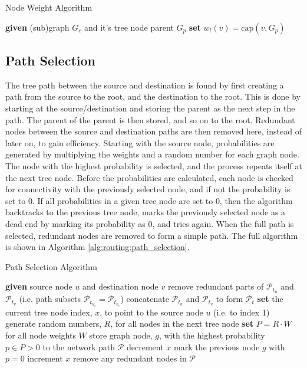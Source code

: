 \begin{algorithm}
	\caption{Node Weight Algorithm}
	\begin{algorithmic}[1]
		\STATE \textbf{given} (sub)graph $G_c$ and it's tree node parent $G_p$
			\STATE \textbf{set} $w_l(v)=\textrm{cap}(v,G_p) $
		\ENDFOR
	\end{algorithmic}
	\label{alg:routing:weight_algorithm}
\end{algorithm}

\subsection{Path Selection}\label{sec:routing:implementation:path_selection}

The tree path between the source and destination is found by first creating a path from the source to the root, and the destination to the root. This is done by starting at the source/destination and storing the parent as the next step in the path. The parent of the parent is then stored, and so on to the root. Redundant nodes between the source and destination paths are then removed here, instead of later on, to gain efficiency. Starting with the source node, probabilities are generated by multiplying the weights and a random number for each graph node. The node with the highest probability is selected, and the process repeats itself at the next tree node. Before the probabilities are calculated, each node is checked for connectivity with the previously selected node, and if not the probability is set to 0. If all probabilities in a given tree node are set to 0, then the algorithm backtracks to the previous tree node, marks the previously selected node as a dead end by marking its probability as 0, and tries again. When the full path is selected, redundant nodes are removed to form a simple path. The full algorithm is shown in Algorithm \ref{alg:routing:path_selection}.

\begin{algorithm}
	\caption{Path Selection Algorithm}
	\begin{algorithmic}[1]
		\STATE \textbf{given} source node $u$ and destination node $v$
		\STATE remove redundant parts of $\mathscr{P}_{t_u} $ and $\mathscr{P}_{t_v} $ (i.e. path subsets $\mathscr{P}_{t_{u_s}}=\mathscr{P}_{t_{v_s}} $)
		\STATE concatenate $\mathscr{P}_{t_u} $ and $\mathscr{P}_{t_v} $ to form $\mathscr{P}_t $
		\STATE \textbf{set} the current tree node index, $x$, to point to the source node $u$ (i.e. to index 1)
		\REPEAT
			\STATE generate random numbers, $R$, for all nodes in the next tree node
			\STATE \textbf{set} $P=R\cdot W $ for all node weights $W$
			\STATE store graph node, $g$, with the highest probability $p\in P>0 $  to the network path $\mathscr{P} $
				\STATE decrement $x$
				\STATE mark the previous node $g$ with $p=0$
			\ELSE
				\STATE increment $x$
			\ENDIF
		\STATE remove any redundant nodes in $\mathscr{P} $
	\end{algorithmic}
	\label{alg:routing:path_selection}
\end{algorithm}

